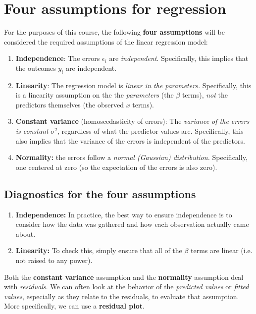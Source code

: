 \documentclass[titlepage, 12pt, leqno]{article}
\begin{document}
\pagebreak
\section{Four assumptions for regression}
For the purposes of this course, the following \textbf{four assumptions} will
be considered the required assumptions of the linear regression model:
\begin{enumerate}
    \item \textbf{Independence}: The errors $\epsilon_i$ are \textit{independent}.
        Specifically, this implies that the outcomes $y_i$ are independent.
    \item \textbf{Linearity}: The regression model is \textit{linear in the
        parameters.} Specifically, this is a linearity assumption on the 
        the \textit{parameters} (the $\beta$ terms), \textit{not} the
        predictors themselves (the observed $x$ terms).
    \item \textbf{Constant variance} (homoscedasticity of errors): The
        \textit{variance of the errors is constant} $\sigma^2$, regardless of
        what the predictor values are. Specifically, this also implies that the
        variance of the errors is independent of the predictors.
    \item \textbf{Normality:} the errors follow a \textit{normal (Gaussian)
        distribution.} Specifically, one centered at zero (so the expectation of
        the errors is also zero).
\end{enumerate}

\subsection{Diagnostics for the four assumptions}
\begin{enumerate}
    \item \textbf{Independence:} In practice, the best way to ensure independence
        is to consider how the data was gathered and how each observation 
        actually came about.
    \item \textbf{Linearity:} To check this, simply ensure that all of the $\beta$
        terms are linear (i.e. not raised to any power).
\end{enumerate}

Both the \textbf{constant variance} assumption and the \textbf{normality} 
assumption deal with \textit{residuals}. We can often look at the behavior 
of the \textit{predicted values} or \textit{fitted values}, especially as they
relate to the residuals, to evaluate that assumption. More specifically, we can
use a \textbf{residual plot}.
\end{document}
